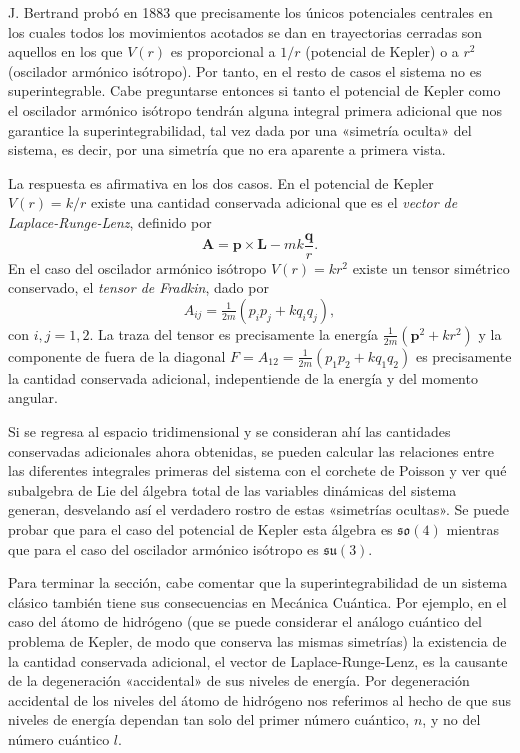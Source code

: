 \documentclass[12pt,a4paper,twocolumn,reqno]{amsart}
\theoremstyle{definition} \newtheorem{defn}[thm]{Definición}
\theoremstyle{definition} \newtheorem{ejemplo}[thm]{Ejemplo}
\theoremstyle{definition} \newtheorem{ejercicio}[thm]{Ejercicio}
\theoremstyle{remark} \newtheorem*{obs}{Observación}
\newcommand{\vect}[1]{\mathbf{#1}}
\begin{document}
J. Bertrand probó en 1883 que precisamente los únicos potenciales centrales en los cuales todos los movimientos acotados se dan en trayectorias cerradas son aquellos en los que $V(r)$ es proporcional a $1/r$ (potencial de Kepler) o a $r^2$ (oscilador armónico isótropo). Por tanto, en el resto de casos el sistema no es superintegrable. Cabe preguntarse entonces si tanto el potencial de Kepler como el oscilador armónico isótropo tendrán alguna integral primera adicional que nos garantice la superintegrabilidad, tal vez dada por una «simetría oculta» del sistema, es decir, por una simetría que no era aparente a primera vista.

La respuesta es afirmativa en los dos casos. En el potencial de Kepler $V(r)=k/r$ existe una cantidad conservada adicional que es el \emph{vector de Laplace-Runge-Lenz}, definido por
\begin{equation}
  \vect{A}=\vect{p}\times \vect{L}-mk\frac{\vect{q}}{r}. 
\end{equation}
En el caso del oscilador armónico isótropo $V(r)=kr^2$ existe un tensor simétrico conservado, el \emph{tensor de Fradkin}, dado por
\begin{equation}
  A_{ij}=\tfrac{1}{2m}(p_ip_j+kq_iq_j), 
\end{equation}
con $i,j=1,2$. La traza del tensor es precisamente la energía $\tfrac{1}{2m}(\vect{p}^2+kr^2)$ y la componente de fuera de la diagonal $F=A_{12}=\tfrac{1}{2m}(p_1p_2+kq_1q_2)$ es precisamente la cantidad conservada adicional, indepentiende de la energía y del momento angular. 

Si se regresa al espacio tridimensional y se consideran ahí las cantidades conservadas adicionales ahora obtenidas, se pueden calcular las relaciones entre las diferentes integrales primeras del sistema con el corchete de Poisson y ver qué subalgebra de Lie del álgebra total de las variables dinámicas del sistema generan, desvelando así el verdadero rostro de estas «simetrías ocultas». Se puede probar que para el caso del potencial de Kepler esta álgebra es $\mathfrak{so}(4)$ mientras que para el caso del oscilador armónico isótropo es $\mathfrak{su}(3)$.

Para terminar la sección, cabe comentar que la superintegrabilidad de un sistema clásico también tiene sus consecuencias en Mecánica Cuántica. Por ejemplo, en el caso del átomo de hidrógeno (que se puede considerar el análogo cuántico del problema de Kepler, de modo que conserva las mismas simetrías) la existencia de la cantidad conservada adicional, el vector de Laplace-Runge-Lenz, es la causante de la degeneración «accidental» de sus niveles de energía. Por degeneración accidental de los niveles del átomo de hidrógeno nos referimos al hecho de que sus niveles de energía dependan tan solo del primer número cuántico, $n$, y no del número cuántico $l$.
\end{document}
